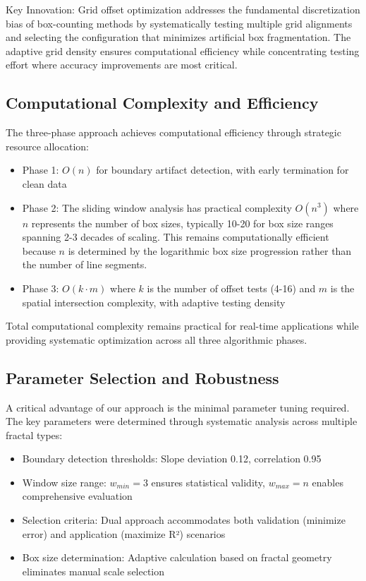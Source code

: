 \documentclass[preprint,12pt]{elsarticle}
\def\textbf#1{#1}%
\begin{document}
\textbf{Key Innovation}: Grid offset optimization addresses the fundamental discretization bias of box-counting methods by systematically testing multiple grid alignments and selecting the configuration that minimizes artificial box fragmentation. The adaptive grid density ensures computational efficiency while concentrating testing effort where accuracy improvements are most critical.

\subsection{Computational Complexity and Efficiency}

The three-phase approach achieves computational efficiency through strategic resource allocation:

\begin{itemize}
\item \textbf{Phase 1}: $O(n)$ for boundary artifact detection, with early termination for clean data

\item \textbf{Phase 2}: The sliding window analysis has practical complexity $O(n^3)$ where $n$ represents the number of box sizes, typically 10-20 for box size ranges spanning 2-3 decades of scaling. This remains computationally efficient because $n$ is determined by the logarithmic box size progression rather than the number of line segments.

\item \textbf{Phase 3}: $O(k \cdot m)$ where $k$ is the number of offset tests (4-16) and $m$ is the spatial intersection complexity, with adaptive testing density
\end{itemize}

Total computational complexity remains practical for real-time applications while providing systematic optimization across all three algorithmic phases.

\subsection{Parameter Selection and Robustness}

A critical advantage of our approach is the minimal parameter tuning required. The key parameters were determined through systematic analysis across multiple fractal types:

\begin{itemize}
\item \textbf{Boundary detection thresholds}: Slope deviation 0.12, correlation 0.95
\item \textbf{Window size range}: $w_{min} = 3$ ensures statistical validity, $w_{max} = n$ enables comprehensive evaluation
\item \textbf{Selection criteria}: Dual approach accommodates both validation (minimize error) and application (maximize R²) scenarios
\item \textbf{Box size determination}: Adaptive calculation based on fractal geometry eliminates manual scale selection
\end{itemize}
\end{document}
